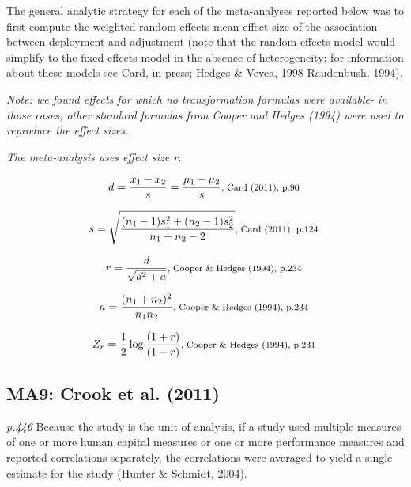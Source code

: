 \documentclass{article}
\begin{document}
The general analytic strategy for each of the meta-analyses reported below was to first compute the weighted random-effects mean effect size of the association between deployment and adjustment (note that the random-effects model would simplify to the fixed-effects model in the absence of heterogeneity; for information about these models see Card, in press; Hedges \& Vevea, 1998 Raudenbush, 1994).

\vspace{3 mm}
\textit{Note: we found effects for which no transformation formulas were available- in those cases, other standard formulas from Cooper and Hedges (1994) were used to reproduce the effect sizes.}

\vspace{3mm}
\textit{The meta-analysis uses effect size r.}

\begin{equation*}
d={\frac {{\bar {x}}_{1}-{\bar {x}}_{2}}{s}}={\frac {\mu_{1}-\mu_{2}}{s}}  \mbox {\footnotesize, Card (2011), p.90 } 
\end{equation*}

\begin{equation*}
s={\sqrt {\frac {(n_{1}-1)s_{1}^{2}+(n_{2}-1)s_{2}^{2}}{n_{1}+n_{2}-2}}} \mbox{\footnotesize, Card (2011), p.124 } 
\end{equation*}

\begin{equation*}
r=\frac{d}{\sqrt{d^{2}+a}} \mbox{\footnotesize, Cooper \& Hedges (1994), p.234 }
\end{equation*}

\begin{equation*}
a=\frac{(n_{1}+n_{2})^{2}}{n_{1}n_{2}} \mbox{\footnotesize, Cooper \& Hedges (1994), p.234 }
\end{equation*}

\begin{equation*}
Z_{r} = \frac{1}{2}\log\frac{(1+r)}{(1-r)} \mbox{\footnotesize, Cooper \& Hedges (1994), p.231 }
\end{equation*}

\subsection*{MA9: Crook et al. (2011)}

\textit{p.446} Because the study is the unit of analysis, if a study used multiple measures of one or more human capital measures or one or more performance measures and reported correlations separately, the correlations were averaged to yield a single estimate for the study (Hunter \& Schmidt, 2004).
\end{document}
